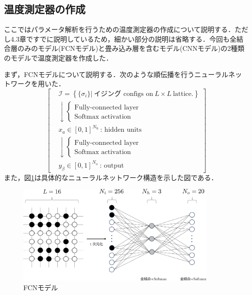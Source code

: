\documentclass[a4paper,11pt]{jsreport}
\begin{document}
\subsection{温度測定器の作成}
ここではパラメータ解析を行うための温度測定器の作成について説明する．ただし4.3章ですでに説明しているため，細かい部分の説明は省略する．今回も全結合層のみのモデル(FCNモデル)と畳み込み層を含むモデル(CNNモデル)の2種類のモデルで温度測定器を作成した．\par
まず，FCNモデルについて説明する．次のような順伝播を行うニューラルネットワークを用いた．
\begin{equation}
  \left[
    \begin{aligned}
       & \mathcal{I} = \left\{ \{ \sigma_i \} \Big| \ \text{イジング configs on} \ L \times L \ \text{lattice.} \right\} \\
       & \downarrow
      \begin{cases}
        \text{Fully-connected layer} \\
        \text{Softmax activation}
      \end{cases}                                                                            \\
       & x_a \in [0,1]^{N_{\text{h}}} \ \text{: hidden units}                                                                  \\
       & \downarrow
      \begin{cases}
        \text{Fully-connected layer} \\
        \text{Softmax activation}
      \end{cases}                                                                            \\
       & y_{\beta} \in [0,1]^{N_{\text{o}}} \ \text{: output}
    \end{aligned}
    \right]
\end{equation}
また，図\ref{温度測定器FCN2}は具体的なニューラルネットワーク構造を示した図である．

\begin{figure}[H]
  \begin{center}
      \includegraphics[height=5cm]{image/温度測定器FCN2.png}
      \caption{FCNモデル}
      \label{温度測定器FCN2}
  \end{center}
\end{figure}
\end{document}
